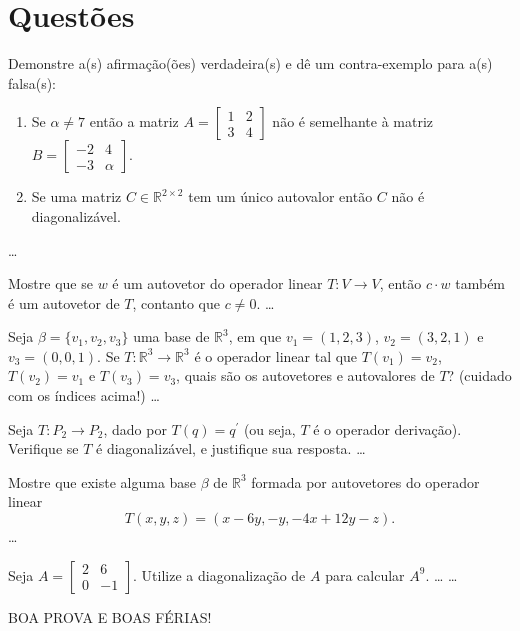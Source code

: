 \documentclass[12pt,a4paper]{article}
\newcommand*\R{\mathbb{R}}
\begin{document}
\section*{Questões}
\begin{ExerciseList}
\Exercise[title={2,0}]
Demonstre a(s) afirmação(ões) verdadeira(s) e dê um contra-exemplo para a(s) falsa(s):
\begin{enumerate}
\item Se $\alpha \neq 7$ então a matriz $A
=
\begin{bmatrix}
1 & 2 \\ 3 & 4
\end{bmatrix}
$ não é semelhante à matriz $B=
\begin{bmatrix}
-2 & 4 \\ -3 & \alpha
\end{bmatrix}$.
\item Se uma matriz $C \in \R^{2 \times 2}$ tem um único autovalor então $C$ não é diagonalizável.
\end{enumerate}
\Answer
\color{red}
\ldots


\Exercise[title={2,0}] Mostre que se $w$ é um autovetor do operador linear $T: V \to V$, então $c \cdot w$ também é um autovetor de $T$, contanto que $c \neq 0$.
\Answer
\color{red}
\ldots


\Exercise[title={2,0}] Seja $\beta = \{ v_1, v_2, v_3 \}$ uma base de $\R^3$, em que $v_1 = (1,2,3)$, $v_2 = (3,2,1)$ e $v_3 = (0,0,1)$. Se $T: \R^3 \to \R^3$ é o operador linear tal que $T(v_1) = v_2$, $T(v_2) = v_1$ e $T(v_3) = v_3$, quais são os autovetores e autovalores de $T$? (cuidado com os índices acima!)
\Answer
\color{red}
\ldots


\Exercise[title={2,0}] Seja $T: P_2 \to P_2$, dado por $T(q) = q^\prime$ (ou seja, $T$ é o operador derivação). Verifique se $T$ é diagonalizável, e justifique sua resposta.
\Answer
\color{red}
\ldots


\Exercise[title={2,0}]
Mostre que existe alguma base $\beta$ de $\R^3$ formada por autovetores do operador linear
\[
T(x,y,z) = (x - 6 y, -y, -4 x + 12 y - z).
\]
\Answer
\color{red}
\ldots


\Exercise[title={2,0}]
Seja $A = 
\begin{bmatrix}
2 & 6 \\ 0 & -1
\end{bmatrix}$. Utilize a diagonalização de $A$ para calcular $A^9$.
\Answer \ldots
\color{red}
\ldots
\end{ExerciseList}

\vfill
\begin{center}
BOA PROVA E BOAS FÉRIAS!
\end{center}

\end{document}
